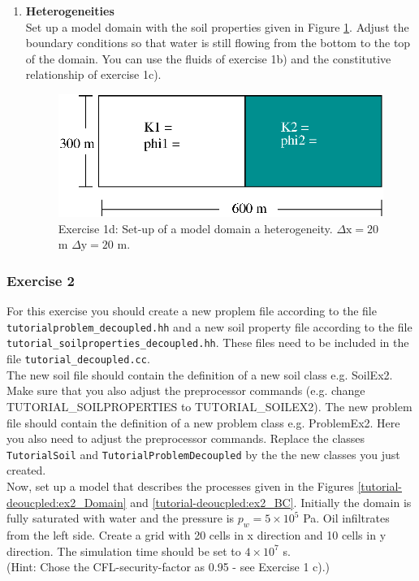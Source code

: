 \begin{enumerate}
\item \textbf{Heterogeneities}  \\
Set up a model domain with the soil properties given in Figure \ref{tutorial-deoucpled:exercise1_d}. Adjust the boundary conditions so that water is still flowing from the bottom to the top of the domain. You can use the fluids of exercise 1b) and the constitutive relationship of exercise 1c). 

\begin{figure}[h]
\centering
\includegraphics[width=0.5\linewidth,keepaspectratio]{EPS/exercise1_c.eps}
\caption{Exercise 1d: Set-up of a model domain a heterogeneity. $\Delta \text{x} = 20$ m $\Delta \text{y} = 20$ m.}\label{tutorial-deoucpled:exercise1_d}
\end{figure}

\end{enumerate}

\subsubsection{Exercise 2}
For this exercise you should create a new proplem file according to the file \texttt{tutorialproblem\_decoupled.hh} and a new soil property file according to the file \texttt{tutorial\_soilproperties\_decoupled.hh}. These files need to be included in the file \texttt{tutorial\_decoupled.cc}.\\
The new soil file should contain the definition of a new soil class e.g. SoilEx2. Make sure that you also adjust the preprocessor commands (e.g. change TUTORIAL\_SOILPROPERTIES to TUTORIAL\_SOILEX2). 
The new problem file should contain the definition of a new problem class e.g. ProblemEx2. Here you also need to adjust the preprocessor commands. 
Replace the classes \texttt{TutorialSoil} and \texttt{TutorialProblemDecoupled} by the the new classes you just created. \\
Now, set up a model that describes the processes given in the Figures \ref{tutorial-deoucpled:ex2_Domain} and \ref{tutorial-deoucpled:ex2_BC}. Initially the domain is fully saturated with water and the pressure is $p_w = 5 \times 10^5$ Pa. Oil infiltrates from the left side. Create a grid with 20 cells in x direction and 10 cells in y direction. The simulation time should be set to $4\times 10^7$ s.\\
(Hint: Chose the CFL-security-factor as 0.95 - see Exercise 1 c).)

